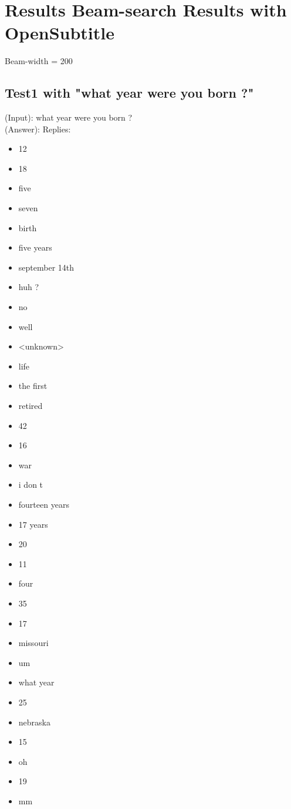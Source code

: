 \chapter{Results Beam-search Results with OpenSubtitle}
\label{apendix:results:Beam-search-200:OpenSubtitle}
Beam-width = 200\\
\section{Test1 with "what year were you born ?"}
\label{apendix:result1:Beam-search-200:OpenSubtitle}
(Input): what year were you born ?\\
(Answer): Replies:
\begin{multicols}{2}
	\begin{itemize}
		\item 12
		\item 18
		\item five
		\item seven
		\item birth
		\item five years
		\item september 14th
		\item huh ?
		\item no
		\item well
		\item <unknown>
		\item life
		\item the first
		\item retired
		\item 42
		\item 16
		\item war
		\item i don t
		\item fourteen years
		\item 17 years
		\item 20
		\item 11
		\item four
		\item 35
		\item 17
		\item missouri
		\item um
		\item what year
		\item 25
		\item nebraska
		\item 15
		\item oh
		\item 19
		\item mm

\end{itemize}
\end{multicols}
